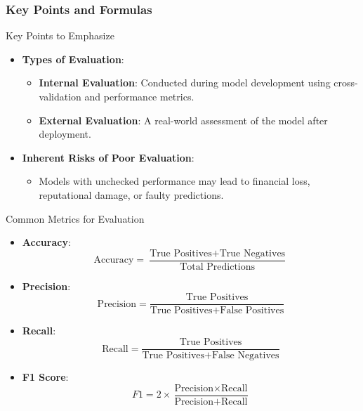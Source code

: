 \documentclass{beamer}
\begin{document}
\begin{frame}[fragile]
    \frametitle{Key Points and Formulas}
    \begin{block}{Key Points to Emphasize}
        \begin{itemize}
            \item \textbf{Types of Evaluation}:
                \begin{itemize}
                    \item \textbf{Internal Evaluation}: Conducted during model development using cross-validation and performance metrics.
                    \item \textbf{External Evaluation}: A real-world assessment of the model after deployment.
                \end{itemize}
            \item \textbf{Inherent Risks of Poor Evaluation}:
                \begin{itemize}
                    \item Models with unchecked performance may lead to financial loss, reputational damage, or faulty predictions.
                \end{itemize}
        \end{itemize}
    \end{block}
    
    \begin{block}{Common Metrics for Evaluation}
        \begin{itemize}
            \item \textbf{Accuracy}: 
            \begin{equation}
                \text{Accuracy} = \frac{\text{True Positives} + \text{True Negatives}}{\text{Total Predictions}}
            \end{equation}
            \item \textbf{Precision}:
            \begin{equation}
                \text{Precision} = \frac{\text{True Positives}}{\text{True Positives} + \text{False Positives}}
            \end{equation}
            \item \textbf{Recall}:
            \begin{equation}
                \text{Recall} = \frac{\text{True Positives}}{\text{True Positives} + \text{False Negatives}}
            \end{equation}
            \item \textbf{F1 Score}:
            \begin{equation}
                F1 = 2 \times \frac{\text{Precision} \times \text{Recall}}{\text{Precision} + \text{Recall}}
            \end{equation}
        \end{itemize}
    \end{block}
    

\end{frame}
\end{document}
